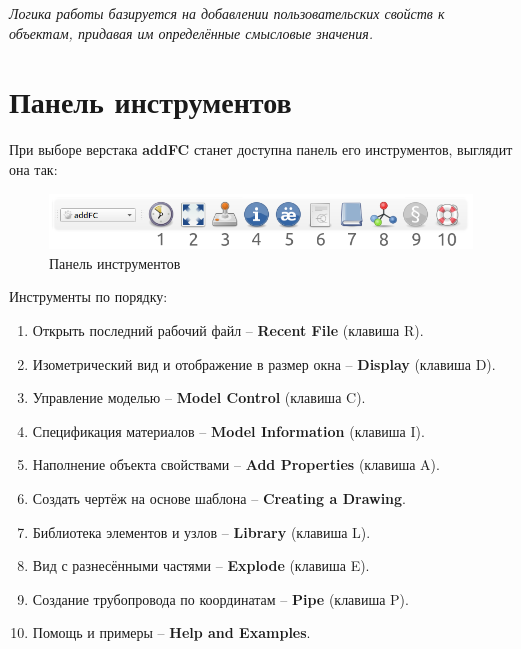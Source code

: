 \documentclass[a4paper,12pt]{article}
\begin{document}
\begin{center}\emph{Логика работы базируется на добавлении пользовательских свойств к объектам, придавая им определённые смысловые значения.}\end{center}




\section{Панель инструментов}

При выборе верстака \textbf{addFC} станет доступна панель его инструментов, выглядит она так:

\begin{figure}[htp]
	\centering
	\includegraphics[scale=0.8]{img/toolbar.png}
	\caption{Панель инструментов}
	\label{sec:toolbar}
\end{figure}

\begin{flushleft}Инструменты по порядку:\end{flushleft}
\begin{enumerate}
	\item Открыть последний рабочий файл -- \textbf{Recent File} (клавиша R).\label{sec:1}
	\item Изометрический вид и отображение в размер окна -- \textbf{Display} (клавиша D).\label{sec:2}
	\item Управление моделью -- \textbf{Model Control} (клавиша C).\label{sec:3}
	\item Спецификация материалов -- \textbf{Model Information} (клавиша I).\label{sec:4}
	\item Наполнение объекта свойствами -- \textbf{Add Properties} (клавиша A).\label{sec:5}
	\item Создать чертёж на основе шаблона -- \textbf{Creating a Drawing}.\label{sec:6}
	\item Библиотека элементов и узлов -- \textbf{Library} (клавиша L).\label{sec:7}
    \item Вид с разнесёнными частями -- \textbf{Explode} (клавиша E).\label{sec:8}
	\item Создание трубопровода по координатам -- \textbf{Pipe} (клавиша P).\label{sec:9}
    \item Помощь и примеры -- \textbf{Help and Examples}.\label{sec:10}
\end{enumerate}
\end{document}
